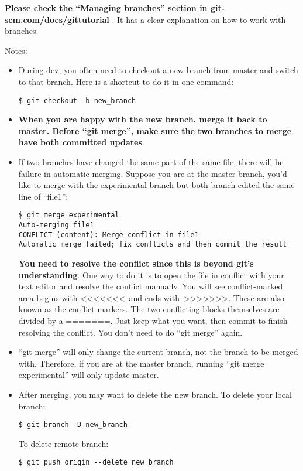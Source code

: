 \documentclass{article} %
\newcommand{\q}[1]{``#1''}
\begin{document}
\textbf{Please check the \q{Managing branches} section in git-scm.com/docs/gittutorial} . It has a clear explanation on how to work with branches.

Notes:

\begin{itemize}

    \item During dev, you often need to checkout a new branch from master and switch to that branch. Here is a shortcut to do it in one command:

\begin{lstlisting}
$ git checkout -b new_branch 
\end{lstlisting}

	\item \textbf{When you are happy with the new branch, merge it back to master. Before \q{git merge}, make sure the two branches to merge have both committed updates}.

	\item If two branches have changed the same part of the same file, there will be failure in automatic merging. Suppose you are at the master branch, you'd like to merge with the experimental branch but both branch edited the same line of \q{file1}:

\begin{lstlisting}
$ git merge experimental
Auto-merging file1
CONFLICT (content): Merge conflict in file1
Automatic merge failed; fix conflicts and then commit the result
\end{lstlisting}

\textbf{You need to resolve the conflict since this is beyond git's understanding}. One way to do it is to open the file in conflict with your text editor and resolve the conflict manually. You will see conflict-marked area begins with \textless\textless\textless\textless\textless\textless\textless~and ends with~\textgreater\textgreater\textgreater\textgreater\textgreater\textgreater\textgreater. These are also known as the conflict markers. The two conflicting blocks themselves are divided by a =======. Just keep what you want, then commit to finish resolving the conflict. You don't need to do \q{git merge} again. 

	\item \q{git merge} will only change the current branch, not the branch to be merged with. Therefore, if you are at the master branch, running \q{git merge experimental} will only update master.

    \item After merging, you may want to delete the new branch. To delete your local branch:

\begin{lstlisting}
$ git branch -D new_branch
\end{lstlisting}

To delete remote branch:

\begin{lstlisting}
$ git push origin --delete new_branch
\end{lstlisting}

\end{itemize}
\end{document}
